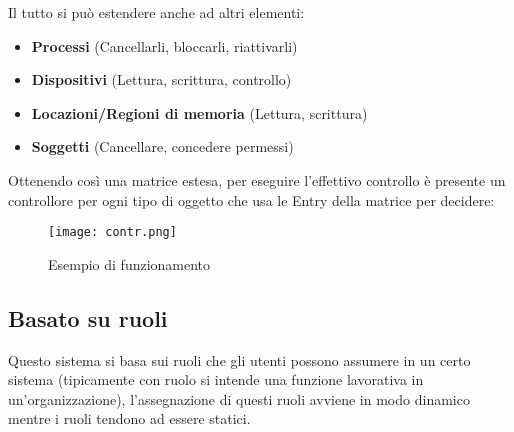\documentclass{article}
\begin{document}
\noindent Il tutto si può estendere anche ad altri elementi:
\begin{itemize}
    \item \textbf{Processi} (Cancellarli, bloccarli, riattivarli)
    \item \textbf{Dispositivi} (Lettura, scrittura, controllo)
    \item \textbf{Locazioni/Regioni di memoria} (Lettura, scrittura)
    \item \textbf{Soggetti} (Cancellare, concedere permessi)
\end{itemize}
\noindent Ottenendo così una matrice estesa, per eseguire l'effettivo controllo è presente un controllore per ogni tipo di oggetto che usa le Entry della matrice per decidere:

\begin{figure}[ht]
    \centering
    \texttt{[image: contr.png]}
    \caption{Esempio di funzionamento}
\end{figure}

\subsection{Basato su ruoli}

Questo sistema si basa sui ruoli che gli utenti possono assumere in un certo sistema (tipicamente con ruolo si intende una funzione lavorativa in un'organizzazione), l'assegnazione di questi ruoli avviene in modo dinamico mentre i ruoli tendono ad essere statici.\newline
\end{document}
